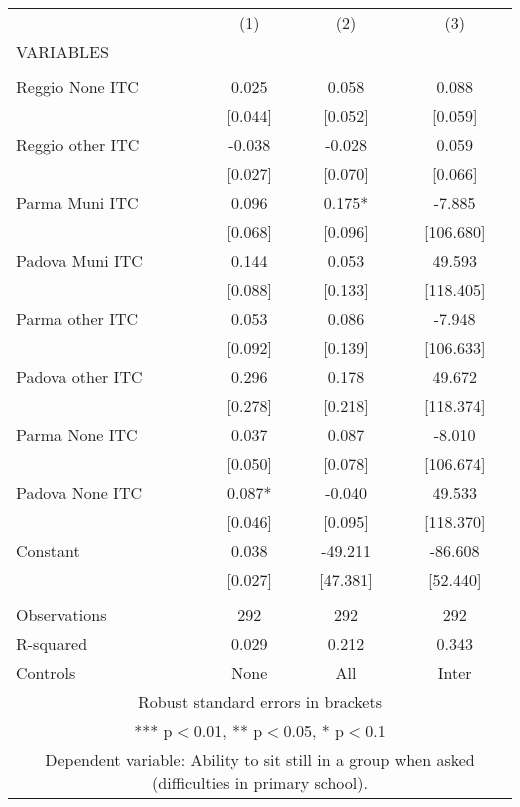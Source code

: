 \begin{tabular}{lccc} \hline
 & (1) & (2) & (3) \\
VARIABLES &  &  &  \\ \hline
 &  &  &  \\
Reggio None ITC & 0.025 & 0.058 & 0.088 \\
 & [0.044] & [0.052] & [0.059] \\
Reggio other ITC & -0.038 & -0.028 & 0.059 \\
 & [0.027] & [0.070] & [0.066] \\
Parma Muni ITC & 0.096 & 0.175* & -7.885 \\
 & [0.068] & [0.096] & [106.680] \\
Padova Muni ITC & 0.144 & 0.053 & 49.593 \\
 & [0.088] & [0.133] & [118.405] \\
Parma other ITC & 0.053 & 0.086 & -7.948 \\
 & [0.092] & [0.139] & [106.633] \\
Padova other ITC & 0.296 & 0.178 & 49.672 \\
 & [0.278] & [0.218] & [118.374] \\
Parma None ITC & 0.037 & 0.087 & -8.010 \\
 & [0.050] & [0.078] & [106.674] \\
Padova None ITC & 0.087* & -0.040 & 49.533 \\
 & [0.046] & [0.095] & [118.370] \\
Constant & 0.038 & -49.211 & -86.608 \\
 & [0.027] & [47.381] & [52.440] \\
 &  &  &  \\
Observations & 292 & 292 & 292 \\
R-squared & 0.029 & 0.212 & 0.343 \\
 Controls & None & All & Inter \\ \hline
\multicolumn{4}{c}{ Robust standard errors in brackets} \\
\multicolumn{4}{c}{ *** p$<$0.01, ** p$<$0.05, * p$<$0.1} \\
\multicolumn{4}{c}{ Dependent variable: Ability to sit still in a group when asked (difficulties in primary school).} \\
\end{tabular}
